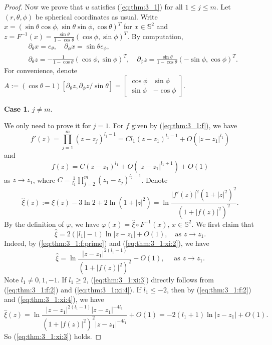 \documentclass[12pt]{article}
\newcommand{\bS}{\mathbb{S}}
\begin{document}
\begin{proof}
	Now we prove that $u$ satisfies (\ref{eq:thm:3_1}) for all $1\le j\le m$. Let $(r, \theta, \phi)$ be spherical coordinates as usual. Write $x=(\sin\theta\cos\phi, \sin\theta\sin\phi, \cos\theta)^T$ for $x\in\bS^2$ and $z=F^{-1}(x)=\frac{\sin\theta}{1-\cos\theta}(\cos\phi, \sin\phi)^T$. By computation, 
	\begin{equation}\label{eq:thm:3_1:d}
	\begin{split}
		& \partial_{\theta}x=e_{\theta}, \quad \partial_{\phi}x=\sin\theta e_{\phi}, \\
		& \partial_{\theta}z=-\frac{1}{1-\cos\theta}(\cos\phi, \sin\phi)^T, \quad \partial_{\phi}z=\frac{\sin\theta}{1-\cos\theta}(-\sin\phi, \cos\phi)^T. 
	\end{split}
	\end{equation}
	For convenience, denote $A:=(\cos\theta-1)[\partial_\theta z, \partial_{\phi} z/\sin\theta]=
	\begin{bmatrix}
	\cos\phi & \sin\phi \\
	\sin\phi & -\cos\phi
	\end{bmatrix}$. 

	\noindent\textbf{Case 1.} $j\ne m$. 

	We only need to prove it for $j=1$. For $f$ given by (\ref{eq:thm:3_1:f}), we have 
	\begin{equation}\label{eq:thm:3_1:f:prime}
		f'(z)=\prod_{j=1}^m(z-z_j)^{l_j-1}= C l_1(z-z_1)^{l_1-1}+O(|z-z_1|^{l_1}) 
	\end{equation}
	and 
	\begin{equation}\label{eq:thm:3_1:f:2}
		f(z)=C(z-z_1)^{l_1}+O(|z-z_1|^{l_1+1}) + O(1)
	\end{equation}
	as $z\to z_1$, where $C = \frac{1}{l_1}\prod_{j=2}^m(z_1-z_{j})^{l_{j}-1}$. Denote
	\begin{equation}\label{eq:thm:3_1:xi:2}
		\hat{\xi}(z):=\xi(z)-3\ln 2+2\ln (1+|z|^2)=\ln \frac{|f'(z)|^2(1+|z|^2)^2}{(1+|f(z)|^2)^2}.
	\end{equation}
	By the definition of $\varphi$, we have $\varphi(x)=\hat{\xi}\circ F^{-1}(x)$, $x\in\mathbb{S}^2$. We first claim that 
	\begin{equation}\label{eq:thm:3_1:xi:3}
		\hat{\xi}=2(|l_1|-1)\ln |z-z_1|+O(1), \quad \textrm{as }z\to z_1.
	\end{equation}
	Indeed, by (\ref{eq:thm:3_1:f:prime}) and (\ref{eq:thm:3_1:xi:2}), we have 
	\begin{equation}\label{eq:thm:3_1:xi:4}
		\hat{\xi}= \ln \frac{|z-z_1|^{2(l_1-1)}}{(1+|f(z)|^2)^2}+O(1), 
		\quad \textrm{ as }z\to z_1.
	\end{equation}
	Note $l_1\ne 0, 1, -1$. If $l_1\ge 2$, (\ref{eq:thm:3_1:xi:3}) directly follows from (\ref{eq:thm:3_1:f:2}) and (\ref{eq:thm:3_1:xi:4}). If $l_1\le -2$, then by (\ref{eq:thm:3_1:f:2}) and (\ref{eq:thm:3_1:xi:4}), we have
	\[
		\hat{\xi}(z)=\ln \frac{|z-z_1|^{2(l_1-1)}|z-z_1|^{-4l_1}}{(1+|f(z)|^2)^2|z-z_1|^{-4l_1}}+O(1)
		= - 2 (l_1+1)\ln |z-z_1|+O(1).
	\]
	So (\ref{eq:thm:3_1:xi:3}) holds. 


\end{proof}
\end{document}
